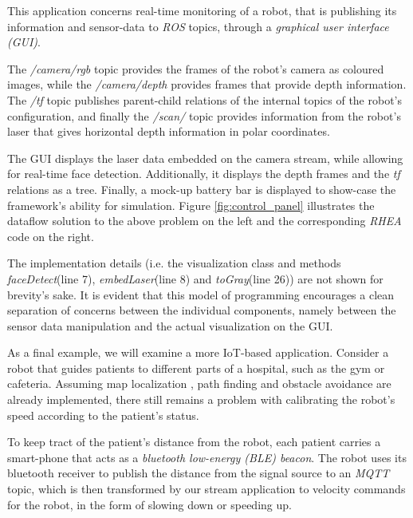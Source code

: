 \documentclass{dithesis}
\begin{document}

This application concerns real-time monitoring of a robot, that is publishing its information and sensor-data to \textit{ROS} topics, through a \textit{graphical user interface (GUI)}.

The \textit{/camera/rgb} topic provides the frames of the robot's camera as coloured images, while the \textit{/camera/depth} provides frames that provide depth information. The \textit{/tf} topic publishes parent-child relations of the internal topics of the robot's configuration, and finally the \textit{/scan/} topic provides information from the robot's laser that gives horizontal depth information in polar coordinates.

The GUI displays the laser data embedded on the camera stream, while allowing for real-time face detection. Additionally, it displays the depth frames and the \textit{tf} relations as a tree. Finally, a mock-up battery bar is displayed to show-case the framework's ability for simulation. Figure \ref{fig:control_panel} illustrates the dataflow solution to the above problem on the left and the corresponding \textit{RHEA} code on the right.


The implementation details (i.e. the visualization class and methods \textit{faceDetect}(line 7), \textit{embedLaser}(line 8) and \textit{toGray}(line 26)) are not shown for brevity's sake. It is evident that this model of programming encourages a clean separation of concerns between the individual components, namely between the sensor data manipulation and the actual visualization on the GUI. 


As a final example, we will examine a more IoT-based application. Consider a robot that guides patients to different parts of a hospital, such as the gym or cafeteria. Assuming map localization , path finding and obstacle avoidance are already implemented, there still remains a problem with calibrating the robot's speed according to the patient's status. 

To keep tract of the patient's distance from the robot, each patient carries a smart-phone that acts as a \textit{bluetooth low-energy (BLE) beacon}. The robot uses its bluetooth receiver to publish the distance from the signal source to an \textit{MQTT} topic, which is then transformed by our stream application to velocity commands for the robot, in the form of slowing down or speeding up.
\end{document}
